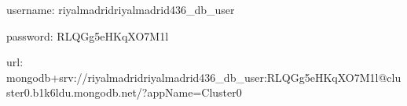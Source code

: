 
username: riyalmadridriyalmadrid436_db_user

password: RLQGg5eHKqXO7M1l

url: mongodb+srv://riyalmadridriyalmadrid436_db_user:RLQGg5eHKqXO7M1l@cluster0.b1k6ldu.mongodb.net/?appName=Cluster0

